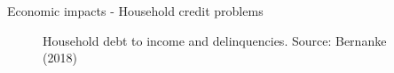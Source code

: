 \begin{frame}{Economic impacts - Household credit problems}

\begin{figure}
\begin{center}


\caption{Household debt to income and delinquencies. Source: Bernanke (2018)}

\end{center}
\end{figure}

\end{frame}



